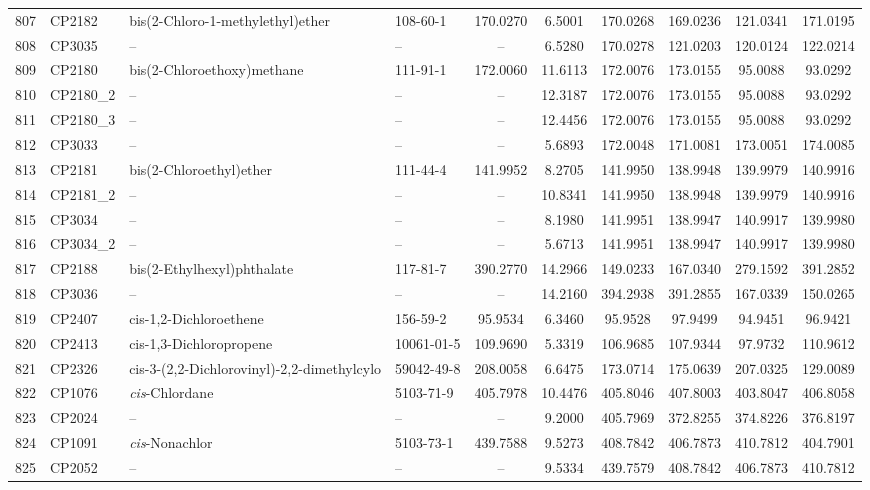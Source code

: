 \begin{longtable}{clllcccccc}
807 & CP2182 & bis(2-Chloro-1-methylethyl)ether & 108-60-1 & 170.0270 & 6.5001 & 170.0268 & 169.0236 & 121.0341 & 171.0195 \\ 
808 & CP3035 & – & – & – & 6.5280 & 170.0278 & 121.0203 & 120.0124 & 122.0214 \\ 
809 & CP2180 & bis(2-Chloroethoxy)methane & 111-91-1 & 172.0060 & 11.6113 & 172.0076 & 173.0155 & 95.0088 & 93.0292 \\ 
810 & CP2180\_2 & – & – & – & 12.3187 & 172.0076 & 173.0155 & 95.0088 & 93.0292 \\ 
811 & CP2180\_3 & – & – & – & 12.4456 & 172.0076 & 173.0155 & 95.0088 & 93.0292 \\ 
812 & CP3033 & – & – & – & 5.6893 & 172.0048 & 171.0081 & 173.0051 & 174.0085 \\ 
813 & CP2181 & bis(2-Chloroethyl)ether & 111-44-4 & 141.9952 & 8.2705 & 141.9950 & 138.9948 & 139.9979 & 140.9916 \\ 
814 & CP2181\_2 & – & – & – & 10.8341 & 141.9950 & 138.9948 & 139.9979 & 140.9916 \\ 
815 & CP3034 & – & – & – & 8.1980 & 141.9951 & 138.9947 & 140.9917 & 139.9980 \\ 
816 & CP3034\_2 & – & – & – & 5.6713 & 141.9951 & 138.9947 & 140.9917 & 139.9980 \\ 
817 & CP2188 & bis(2-Ethylhexyl)phthalate & 117-81-7 & 390.2770 & 14.2966 & 149.0233 & 167.0340 & 279.1592 & 391.2852 \\ 
818 & CP3036 & – & – & – & 14.2160 & 394.2938 & 391.2855 & 167.0339 & 150.0265 \\ 
819 & CP2407 & cis-1,2-Dichloroethene & 156-59-2 & 95.9534 & 6.3460 & 95.9528 & 97.9499 & 94.9451 & 96.9421 \\ 
820 & CP2413 & cis-1,3-Dichloropropene & 10061-01-5 & 109.9690 & 5.3319 & 106.9685 & 107.9344 & 97.9732 & 110.9612 \\ 
821 & CP2326 & cis-3-(2,2-Dichlorovinyl)-2,2-dimethylcylo & 59042-49-8 & 208.0058 & 6.6475 & 173.0714 & 175.0639 & 207.0325 & 129.0089 \\ 
822 & CP1076 & \textit{cis}-Chlordane & 5103-71-9 & 405.7978 & 10.4476 & 405.8046 & 407.8003 & 403.8047 & 406.8058 \\ 
823 & CP2024 & – & – & – & 9.2000 & 405.7969 & 372.8255 & 374.8226 & 376.8197 \\ 
824 & CP1091 & \textit{cis}-Nonachlor & 5103-73-1 & 439.7588 & 9.5273 & 408.7842 & 406.7873 & 410.7812 & 404.7901 \\ 
825 & CP2052 & – & – & – & 9.5334 & 439.7579 & 408.7842 & 406.7873 & 410.7812 \\ 

\end{longtable}
